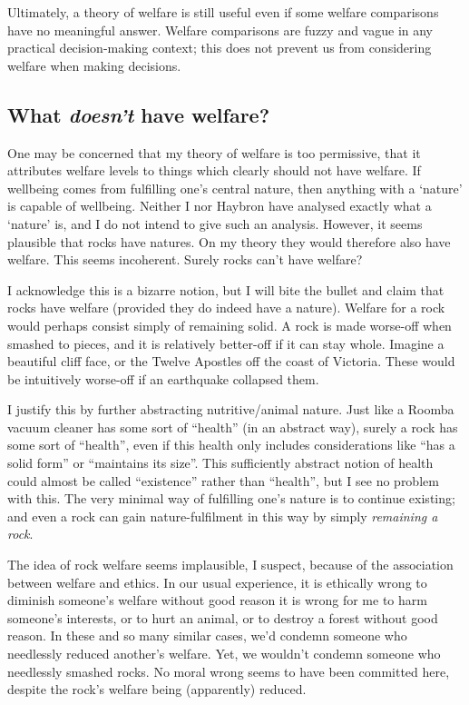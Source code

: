 \documentclass{article}
\begin{document}
Ultimately, a theory of welfare is still useful even if some welfare comparisons have no meaningful answer. Welfare comparisons are fuzzy and vague in any practical decision-making context; this does not prevent us from considering welfare when making decisions. 

\subsection{What \textit{doesn't} have welfare?}

One may be concerned that my theory of welfare is too permissive, that it attributes welfare levels to things which clearly should not have welfare. If wellbeing comes from fulfilling one's central nature, then anything with a `nature' is capable of wellbeing. Neither I nor Haybron have analysed exactly what a `nature' is, and I do not intend to give such an analysis. However, it seems plausible that rocks have natures. On my theory they would therefore also have welfare. This seems incoherent. Surely rocks can't have welfare?

I acknowledge this is a bizarre notion, but I will bite the bullet and claim that rocks have welfare (provided they do indeed have a nature). Welfare for a rock would perhaps consist simply of remaining solid. A rock is made worse-off when smashed to pieces, and it is relatively better-off if it can stay whole. Imagine a beautiful cliff face, or the Twelve Apostles off the coast of Victoria. These would be intuitively worse-off if an earthquake collapsed them. 

I justify this by further abstracting nutritive/animal nature. Just like a Roomba vacuum cleaner has some sort of ``health'' (in an abstract way), surely a rock has some sort of ``health'', even if this health only includes considerations like ``has a solid form'' or ``maintains its size''. This sufficiently abstract notion of health could almost be called ``existence'' rather than ``health'', but I see no problem with this. The very minimal way of fulfilling one's nature is to continue existing; and even a rock can gain nature-fulfilment in this way by simply \textit{remaining a rock}.

The idea of rock welfare seems implausible, I suspect, because of the association between welfare and ethics. In our usual experience, it is ethically wrong to diminish someone's welfare without good reason \textemdash{} it is wrong for me to harm someone's interests, or to hurt an animal, or to destroy a forest without good reason. In these and so many similar cases, we'd condemn someone who needlessly reduced another's welfare. Yet, we wouldn't condemn someone who needlessly smashed rocks. No moral wrong seems to have been committed here, despite the rock's welfare being (apparently) reduced.
\end{document}
